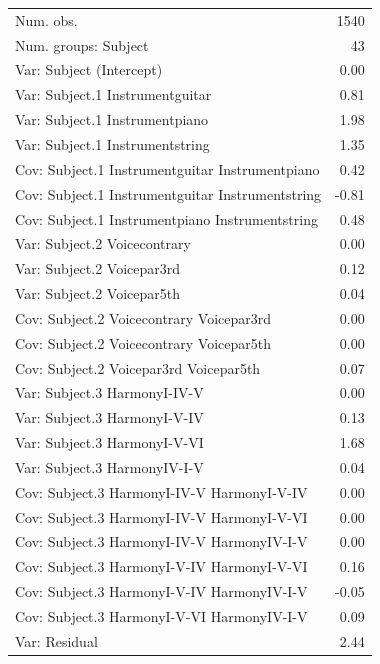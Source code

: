\documentclass{article}
\begin{document}
\begin{center}
\begin{longtable}{l D{)}{)}{9)0}}
Num. obs.                                        & 1540            \\
Num. groups: Subject                             & 43              \\
Var: Subject (Intercept)                         & 0.00            \\
Var: Subject.1 Instrumentguitar                  & 0.81            \\
Var: Subject.1 Instrumentpiano                   & 1.98            \\
Var: Subject.1 Instrumentstring                  & 1.35            \\
Cov: Subject.1 Instrumentguitar Instrumentpiano  & 0.42            \\
Cov: Subject.1 Instrumentguitar Instrumentstring & -0.81           \\
Cov: Subject.1 Instrumentpiano Instrumentstring  & 0.48            \\
Var: Subject.2 Voicecontrary                     & 0.00            \\
Var: Subject.2 Voicepar3rd                       & 0.12            \\
Var: Subject.2 Voicepar5th                       & 0.04            \\
Cov: Subject.2 Voicecontrary Voicepar3rd         & 0.00            \\
Cov: Subject.2 Voicecontrary Voicepar5th         & 0.00            \\
Cov: Subject.2 Voicepar3rd Voicepar5th           & 0.07            \\
Var: Subject.3 HarmonyI-IV-V                     & 0.00            \\
Var: Subject.3 HarmonyI-V-IV                     & 0.13            \\
Var: Subject.3 HarmonyI-V-VI                     & 1.68            \\
Var: Subject.3 HarmonyIV-I-V                     & 0.04            \\
Cov: Subject.3 HarmonyI-IV-V HarmonyI-V-IV       & 0.00            \\
Cov: Subject.3 HarmonyI-IV-V HarmonyI-V-VI       & 0.00            \\
Cov: Subject.3 HarmonyI-IV-V HarmonyIV-I-V       & 0.00            \\
Cov: Subject.3 HarmonyI-V-IV HarmonyI-V-VI       & 0.16            \\
Cov: Subject.3 HarmonyI-V-IV HarmonyIV-I-V       & -0.05           \\
Cov: Subject.3 HarmonyI-V-VI HarmonyIV-I-V       & 0.09            \\
Var: Residual                                    & 2.44            \\
\end{longtable}
\end{center}
\end{document}
